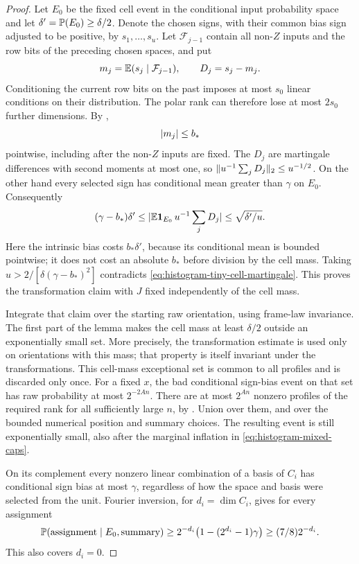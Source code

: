 \begin{proof}
Let $E_0$ be the fixed cell event in the conditional input probability
space and let $\delta'=\mathbb P(E_0)\ge\delta/2$. Denote the chosen signs,
with their common bias sign adjusted to be positive, by $s_1,\ldots,s_u$.
Let $\mathcal F_{j-1}$ contain all non-$Z$ inputs and the row bits of
the preceding chosen spaces, and put
\[
 m_j=\mathbb E(s_j\mid\mathcal F_{j-1}),\qquad D_j=s_j-m_j.
\]
Conditioning the current row bits on the past imposes at most $s_0$
linear conditions on their distribution. The polar rank can therefore
lose at most $2s_0$ further dimensions. By
,
\[
 \lvert m_j\rvert\le b_*
\]
pointwise, including after the non-$Z$ inputs are fixed. The $D_j$ are
martingale differences with second moments at most one, so
$\lVert u^{-1}\sum_jD_j\rVert_2\le u^{-1/2}$. On the other hand every
selected sign has conditional mean greater than $\gamma$ on $E_0$.
Consequently
\begin{equation}\label{eq:histogram-tiny-cell-martingale}
 (\gamma-b_*)\delta'
 \le \lvert \mathbb E\mathbf 1_{E_0}\,u^{-1}\sum_jD_j\rvert
 \le\sqrt{\delta'/u}.
\end{equation}
Here the intrinsic bias costs $b_*\delta'$, because its conditional
mean is bounded pointwise; it does not cost an absolute $b_*$ before
division by the cell mass. Taking
$u>2/[\delta(\gamma-b_*)^2]$ contradicts
\eqref{eq:histogram-tiny-cell-martingale}. This proves the transformation
claim with $J$ fixed independently of the cell mass.

Integrate that claim over the starting raw orientation, using frame-law
invariance. The first part of the lemma makes the cell mass at least
$\delta/2$ outside an exponentially small set. More precisely, the
transformation estimate is used only on orientations with this mass;
that property is itself invariant under the transformations. This
cell-mass exceptional set is common to all profiles and is discarded
only once. For a
fixed $x$, the bad conditional sign-bias event on that set has raw
probability at most $2^{-2An}$. There are at most $2^{An}$ nonzero
profiles of the required rank for all sufficiently large $n$, by
. Union over them, and over the bounded
numerical position and summary choices. The resulting event is still
exponentially small, also after the marginal inflation in
\eqref{eq:histogram-mixed-caps}.

On its complement every nonzero linear combination of a basis of
$C_i$ has conditional sign bias at most $\gamma$, regardless of how
the space and basis were selected from the unit. Fourier inversion,
for $d_i=\dim C_i$, gives for every assignment
\[
 \mathbb P(\text{assignment}\mid E_0,\text{summary})
 \ge2^{-d_i}\bigl(1-(2^{d_i}-1)\gamma\bigr)
 \ge(7/8)2^{-d_i}.
\]
This also covers $d_i=0$.


\end{proof}
